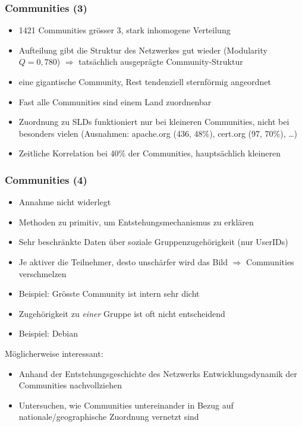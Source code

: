 \documentclass[10pt]{beamer}
\begin{document}
\begin{frame}
  \frametitle{Communities (3)}
  \begin{itemize}
  \item 1421 Communities gr\"osser 3, stark inhomogene Verteilung
  \item Aufteilung gibt die Struktur des Netzwerkes gut wieder
    (Modularity $Q=0,780$) $\Rightarrow$ tats\"achlich ausgepr\"agte
    Community-Struktur
  \item eine gigantische Community, Rest tendenziell sternf\"ormig
    angeordnet
  \item Fast alle Communities sind einem Land zuordnenbar
  \item Zuordnung zu SLDs funktioniert nur bei kleineren Communities,
    nicht bei besonders vielen (Ausnahmen: apache.org (436, 48\%),
    cert.org (97, 70\%), \dots)
  \item Zeitliche Korrelation bei 40\% der Communities,
    haupts\"achlich kleineren
  \end{itemize}
  
\end{frame}

\begin{frame}
  \frametitle{Communities (4)}

  \begin{itemize}
  \item Annahme nicht widerlegt
  \item Methoden zu primitiv, um Entstehungsmechanismus zu erkl\"aren
  \item Sehr beschr\"ankte Daten \"uber soziale Gruppenzugeh\"origkeit
    (nur UserIDs)
  \item Je aktiver die Teilnehmer, desto unsch\"arfer wird das Bild
    $\Rightarrow$ Communities verschmelzen
  \item Beispiel: Gr\"osste Community ist intern sehr dicht
  \item Zugeh\"origkeit zu \emph{einer} Gruppe ist oft nicht
    entscheidend
  \item Beispiel: Debian
  \end{itemize}

  
  M\"oglicherweise interessant:
  \begin{itemize}
  \item Anhand der Entstehungsgeschichte
    des Netzwerks Entwicklungsdynamik der Communities nachvollziehen
  \item Untersuchen, wie Communities untereinander in Bezug auf
    nationale/geographische Zuordnung vernetzt sind
  \end{itemize}
  
\end{frame}
\end{document}
